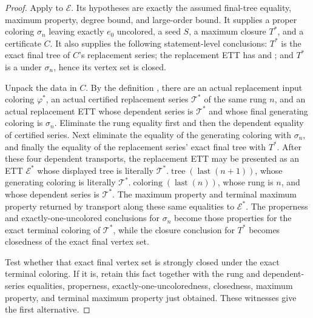 \begin{proof}
Apply  to \(\mathcal E\).  Its
hypotheses are exactly the assumed final-tree equality, maximum property,
degree bound, and large-order bound.  It supplies a proper coloring
\(\sigma_n\) leaving exactly \(e_0\) uncolored, a seed \(S\), a maximum
closure \(T^*\), and a
 certificate \(C\).  It also
supplies the following statement-level conclusions: \(T^*\) is the exact
final tree of \(C\)'s replacement series; the replacement ETT has
 and ; and
\(T^*\) is a  under \(\sigma_n\), hence its
vertex set is closed.

Unpack the data in \(C\).  By the definition
, there are an actual
replacement input coloring \(\varphi^*\), an actual certified replacement
series \(\mathcal T^*\) of the same rung \(n\), and an actual replacement
ETT whose dependent series is \(\mathcal T^*\) and whose final generating
coloring is \(\sigma_n\).  Eliminate the rung equality first and then the
dependent equality of certified series.  Next eliminate the equality of
the generating coloring with \(\sigma_n\), and finally the equality of
the replacement series' exact final tree with \(T^*\).  After these four
dependent transports, the replacement ETT may be presented as an ETT
\(\mathcal E^*\) whose displayed tree is literally
\(\mathcal T^*.\operatorname{tree}(\operatorname{last}(n+1))\), whose
generating coloring is literally
\(\mathcal T^*.\operatorname{coloring}(\operatorname{last}(n))\), whose
rung is \(n\), and whose dependent series is \(\mathcal T^*\).  The maximum
property and terminal maximum property returned by
 transport along these same
equalities to \(\mathcal E^*\).  The properness and exactly-one-uncolored
conclusions for \(\sigma_n\) become those properties for the exact terminal
coloring of \(\mathcal T^*\), while the closure conclusion for \(T^*\)
becomes closedness of the exact final vertex set.

Test whether that exact final vertex set is strongly closed under the exact
terminal coloring.  If it is, retain this fact together with the rung and
dependent-series equalities, properness, exactly-one-uncoloredness,
closedness, maximum property, and terminal maximum property just obtained.
These witnesses give the first alternative.


\end{proof}
